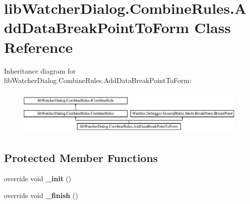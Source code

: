 \hypertarget{classlib_watcher_dialog_1_1_combine_rules_1_1_add_data_break_point_to_form}{\section{lib\+Watcher\+Dialog.\+Combine\+Rules.\+Add\+Data\+Break\+Point\+To\+Form Class Reference}
\label{classlib_watcher_dialog_1_1_combine_rules_1_1_add_data_break_point_to_form}
}
Inheritance diagram for lib\+Watcher\+Dialog.\+Combine\+Rules.\+Add\+Data\+Break\+Point\+To\+Form\+:\begin{figure}[H]
\begin{center}
\leavevmode
\includegraphics[height=2.234043cm]{classlib_watcher_dialog_1_1_combine_rules_1_1_add_data_break_point_to_form}
\end{center}
\end{figure}
\subsection*{Protected Member Functions}
\begin{DoxyCompactItemize}
\item 
\hypertarget{classlib_watcher_dialog_1_1_combine_rules_1_1_add_data_break_point_to_form_aed0fc14438f722e167678071addef665}{override void {\bfseries \+\_\+init} ()}\label{classlib_watcher_dialog_1_1_combine_rules_1_1_add_data_break_point_to_form_aed0fc14438f722e167678071addef665}

\item 
\hypertarget{classlib_watcher_dialog_1_1_combine_rules_1_1_add_data_break_point_to_form_aa83d2ed06b123aa1b46d0acac273fccf}{override void {\bfseries \+\_\+finish} ()}\label{classlib_watcher_dialog_1_1_combine_rules_1_1_add_data_break_point_to_form_aa83d2ed06b123aa1b46d0acac273fccf}

\end{DoxyCompactItemize}

